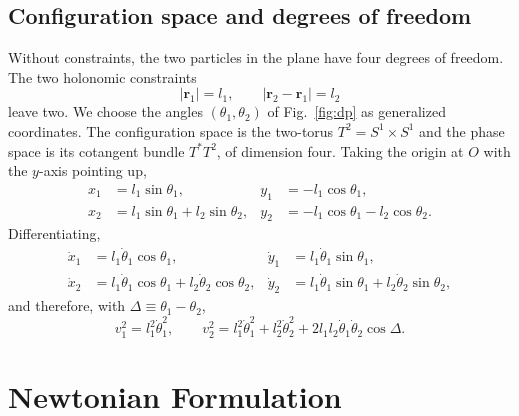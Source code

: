 \documentclass[11pt,a4paper]{book}
\theoremstyle{definition}
\theoremstyle{remark}
\begin{document}
\subsection{Configuration space and degrees of freedom}

Without constraints, the two particles in the plane have four degrees of freedom. The two holonomic constraints
\begin{equation}
  |\bm r_1| = l_1, \qquad |\bm r_2-\bm r_1| = l_2
  \label{eq:constraints}
\end{equation}
leave two. We choose the angles $(\theta_1,\theta_2)$ of Fig.~\ref{fig:dp} as generalized coordinates. The
configuration space is the two-torus $T^2=S^1\times S^1$ and the phase space is its cotangent bundle $T^*T^2$,
of dimension four. Taking the origin at $O$ with the $y$-axis pointing up,
\begin{align}
  x_1 &= l_1\sin\theta_1, & y_1 &= -l_1\cos\theta_1, \label{eq:pos1}\\
  x_2 &= l_1\sin\theta_1 + l_2\sin\theta_2, & y_2 &= -l_1\cos\theta_1 - l_2\cos\theta_2. \label{eq:pos2}
\end{align}
Differentiating,
\begin{align}
  \dot{x}_1 &= l_1\dot\theta_1\cos\theta_1, & \dot{y}_1 &= l_1\dot\theta_1\sin\theta_1,\\
  \dot{x}_2 &= l_1\dot\theta_1\cos\theta_1 + l_2\dot\theta_2\cos\theta_2, &
  \dot{y}_2 &= l_1\dot\theta_1\sin\theta_1 + l_2\dot\theta_2\sin\theta_2,
\end{align}
and therefore, with $\Delta\equiv\theta_1-\theta_2$,
\begin{equation}
  v_1^2 = l_1^2\dot\theta_1^2, \qquad
  v_2^2 = l_1^2\dot\theta_1^2 + l_2^2\dot\theta_2^2 + 2l_1l_2\dot\theta_1\dot\theta_2\cos\Delta .
  \label{eq:v2}
\end{equation}

\section{Newtonian Formulation}
\label{sec:newton}
\end{document}
